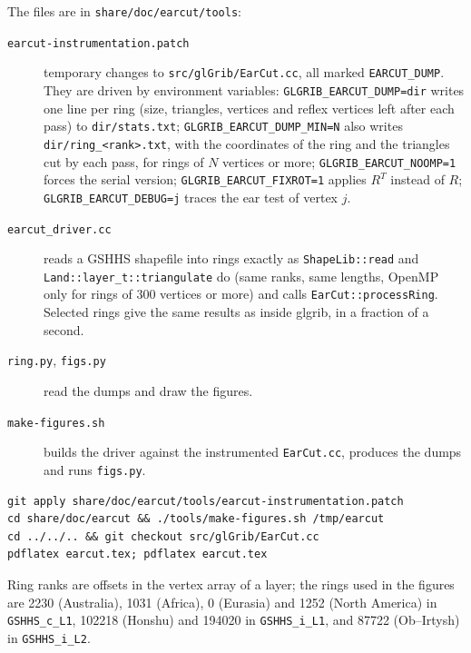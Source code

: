 \documentclass[11pt,a4paper]{article}
\newcommand{\code}[1]{\texttt{#1}}
\begin{document}
The files are in \code{share/doc/earcut/tools}:
\begin{description}
\item[\code{earcut-instrumentation.patch}] temporary changes to \code{src/glGrib/EarCut.cc}, all
  marked \code{EARCUT\_DUMP}. They are driven by environment variables:
  \code{GLGRIB\_EARCUT\_DUMP=dir} writes one line per ring (size, triangles, vertices and reflex
  vertices left after each pass) to \code{dir/stats.txt};
  \code{GLGRIB\_EARCUT\_DUMP\_MIN=N} also writes \code{dir/ring\_<rank>.txt}, with the
  coordinates of the ring and the triangles cut by each pass, for rings of $N$ vertices or more;
  \code{GLGRIB\_EARCUT\_NOOMP=1} forces the serial version;
  \code{GLGRIB\_EARCUT\_FIXROT=1} applies $R^T$ instead of $R$;
  \code{GLGRIB\_EARCUT\_DEBUG=j} traces the ear test of vertex $j$.
\item[\code{earcut\_driver.cc}] reads a GSHHS shapefile into rings exactly as
  \code{ShapeLib::read} and \code{Land::layer\_t::triangulate} do (same ranks, same lengths, OpenMP
  only for rings of 300 vertices or more) and calls \code{EarCut::processRing}. Selected rings give
  the same results as inside glgrib, in a fraction of a second.
\item[\code{ring.py}, \code{figs.py}] read the dumps and draw the figures.
\item[\code{make-figures.sh}] builds the driver against the instrumented \code{EarCut.cc}, produces
  the dumps and runs \code{figs.py}.
\end{description}
\begin{lstlisting}
git apply share/doc/earcut/tools/earcut-instrumentation.patch
cd share/doc/earcut && ./tools/make-figures.sh /tmp/earcut
cd ../../.. && git checkout src/glGrib/EarCut.cc
pdflatex earcut.tex; pdflatex earcut.tex
\end{lstlisting}

Ring ranks are offsets in the vertex array of a layer; the rings used in the figures are 2230
(Australia), 1031 (Africa), 0 (Eurasia) and 1252 (North America) in \code{GSHHS\_c\_L1}, 102218
(Honshu) and 194020 in \code{GSHHS\_i\_L1}, and 87722 (Ob--Irtysh) in \code{GSHHS\_i\_L2}.
\end{document}
